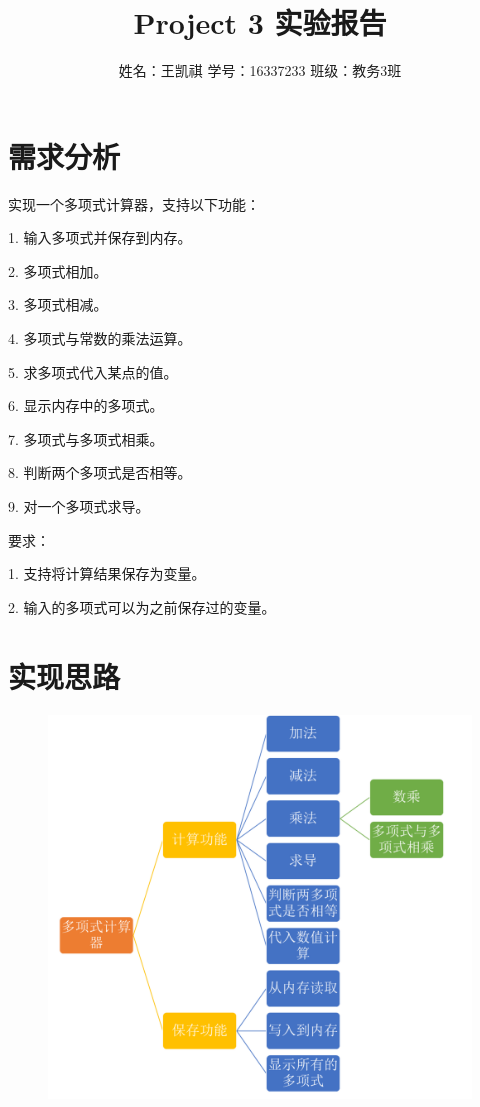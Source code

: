 \documentclass{article}
\begin{document}
\title{Project 3 实验报告}
\author {姓名：王凯祺 \text{ } 学号：16337233 \text{ } 班级：教务3班}
\maketitle

\section{需求分析}

实现一个多项式计算器，支持以下功能：

1. 输入多项式并保存到内存。

2. 多项式相加。

3. 多项式相减。

4. 多项式与常数的乘法运算。

5. 求多项式代入某点的值。

6. 显示内存中的多项式。

7. 多项式与多项式相乘。

8. 判断两个多项式是否相等。

9. 对一个多项式求导。

要求：

1. 支持将计算结果保存为变量。

2. 输入的多项式可以为之前保存过的变量。

\section{实现思路}

\begin{figure}[!hbp]
	\centering
	\includegraphics[scale=0.4]{s1.png}
\end{figure}
\end{document}

